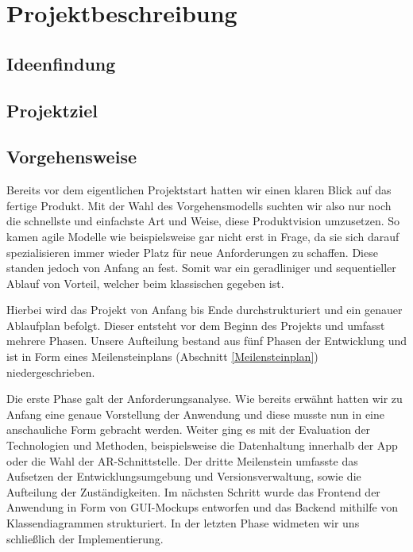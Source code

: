 \chapter{Projektbeschreibung}\label{ch:projektbeschreibung}
\section{Ideenfindung}
\section{Projektziel}\label{projektziel}
\section{Vorgehensweise}
Bereits vor dem eigentlichen Projektstart hatten wir einen klaren Blick auf das fertige Produkt.
Mit der Wahl des Vorgehensmodells suchten wir also nur noch die schnellste und einfachste Art und Weise, diese Produktvision umzusetzen. 
So kamen agile Modelle wie beispielsweise  gar nicht erst in Frage, da sie sich darauf spezialisieren immer wieder Platz für neue Anforderungen zu schaffen. 
Diese standen jedoch von Anfang an fest.
Somit war ein geradliniger und sequentieller Ablauf von Vorteil, welcher beim klassischen  gegeben ist. 

Hierbei wird das Projekt von Anfang bis Ende durchstrukturiert und ein genauer Ablaufplan befolgt.
Dieser entsteht vor dem Beginn des Projekts und umfasst mehrere Phasen. 
Unsere Aufteilung bestand aus fünf Phasen der Entwicklung und ist in Form eines Meilensteinplans (Abschnitt \ref{Meilensteinplan}) niedergeschrieben. 

Die erste Phase galt der Anforderungsanalyse. 
Wie bereits erwähnt hatten wir zu Anfang eine genaue Vorstellung der Anwendung und diese musste nun in eine anschauliche Form gebracht werden. 
Weiter ging es mit der Evaluation der Technologien und Methoden, beispielsweise die Datenhaltung innerhalb der App oder die Wahl der AR-Schnittstelle.
Der dritte Meilenstein umfasste das Aufsetzen der Entwicklungsumgebung und Versionsverwaltung, sowie die Aufteilung der Zuständigkeiten.
Im nächsten Schritt wurde das Frontend der Anwendung in Form von GUI-Mockups entworfen und das Backend mithilfe von Klassendiagrammen strukturiert.
In der letzten Phase widmeten wir uns schließlich der Implementierung.
